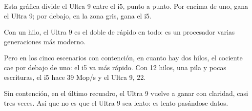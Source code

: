 Esta gráfica divide el Ultra 9 entre el i5, punto a punto. Por encima de uno, gana el Ultra 9; por debajo, en la zona gris, gana el i5.

Con un hilo, el Ultra 9 es el doble de rápido en todo: es un procesador varias generaciones más moderno.

Pero en los cinco escenarios con contención, en cuanto hay dos hilos, el cociente cae por debajo de uno: el i5 va más rápido. Con 12 hilos, una pila y pocas escrituras, el i5 hace 39 Mop/s y el Ultra 9, 22.

Sin contención, en el último recuadro, el Ultra 9 vuelve a ganar con claridad, casi tres veces. Así que no es que el Ultra 9 sea lento: es lento pasándose datos.
